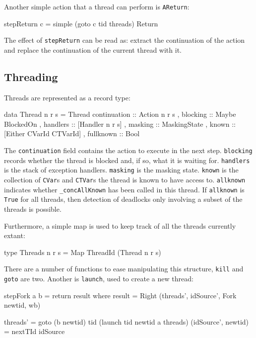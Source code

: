 Another simple action that a thread can perform is \verb|AReturn|:

\begin{haskellcode}
stepReturn c = simple (goto c tid threads) Return
\end{haskellcode}

The effect of \verb|stepReturn| can be read as: extract the
continuation of the action and replace the continuation of the current
thread with it.

\subsection{Threading}
\label{sec:execution-stepwise-threading}

Threads are represented as a record type:

\begin{haskellcode}
data Thread n r s = Thread
  { continuation :: Action n r s
  , blocking     :: Maybe BlockedOn
  , handlers     :: [Handler n r s]
  , masking      :: MaskingState
  , known        :: [Either CVarId CTVarId]
  , fullknown    :: Bool
  }
\end{haskellcode}

The \verb|continuation| field contains the action to execute in the
next step. \verb|blocking| records whether the thread is blocked and,
if so, what it is waiting for. \verb|handlers| is the stack of
exception handlers. \verb|masking| is the masking state. \verb|known|
is the collection of \verb|CVar|s and \verb|CTVar|s the thread is
known to have access to. \verb|allknown| indicates whether
\verb|_concAllKnown| has been called in this thread. If
\verb|allknown| is \verb|True| for all threads, then detection of
deadlocks only involving a subset of the threads is possible.

Furthermore, a simple map is used to keep track of all the threads
currently extant:

\begin{haskellcode}
type Threads n r s = Map ThreadId (Thread n r s)
\end{haskellcode}

There are a number of functions to ease manipulating this structure,
\verb|kill| and \verb|goto| are two. Another is \verb|launch|, used to
create a new thread:

\begin{haskellcode}
stepFork a b = return result where
  result = Right (threads', idSource', Fork newtid, wb)

  threads' = goto (b newtid) tid (launch tid newtid a threads)
  (idSource', newtid) = nextTId idSource
\end{haskellcode}

